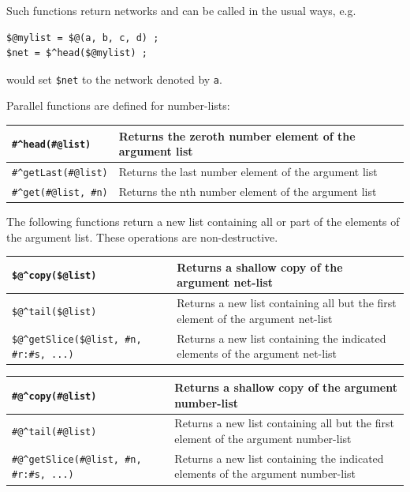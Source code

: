 \documentclass[letterpaper,12pt]{article}
\begin{document}
\vspace{.5cm}

\noindent
Such functions return networks and can be called in the usual ways, 
e.g.

\begin{Verbatim}[fontsize=\small]
$@mylist = $@(a, b, c, d) ;
$net = $^head($@mylist) ;
\end{Verbatim}

\noindent
would set \verb!$net! to the network denoted by \texttt{a}.

Parallel functions are defined for number-lists:

\vspace{.5cm}

\noindent
\begin{tabular}{|l|l|}
\hline
\verb!#^head(#@list)! & Returns the zeroth number element of the argument list\\
\hline
\verb!#^getLast(#@list)! & Returns the last number element of the argument list\\
\hline
\verb!#^get(#@list, #n)! & Returns the nth number element of the argument list\\
\hline
\end{tabular}

\vspace{.5cm}

The following functions return a new list containing all or part of the
elements of the argument list.  These operations are non-destructive.

\vspace{.5cm}

\noindent
\begin{tabular}{|l|p{4.5cm}|}
\hline
\verb!$@^copy($@list)! & Returns a shallow copy of the argument net-list\\
\hline
\verb!$@^tail($@list)! & Returns a new list containing all but the first element of the
argument net-list\\
\hline
\verb!$@^getSlice($@list, #n, #r:#s, ...)! & Returns a new list containing the
indicated elements of the argument net-list\\
\hline
\end{tabular}

\vspace{.5cm}

\noindent
\begin{tabular}{|l|p{4.5cm}|}
\hline
\verb!#@^copy(#@list)! & Returns a shallow copy of the argument number-list\\
\hline
\verb!#@^tail(#@list)! & Returns a new list containing all but the first element of the
argument number-list\\
\hline
\verb!#@^getSlice(#@list, #n, #r:#s, ...)! & Returns a new list containing the
indicated elements of the argument number-list\\
\hline
\end{tabular}
\end{document}
